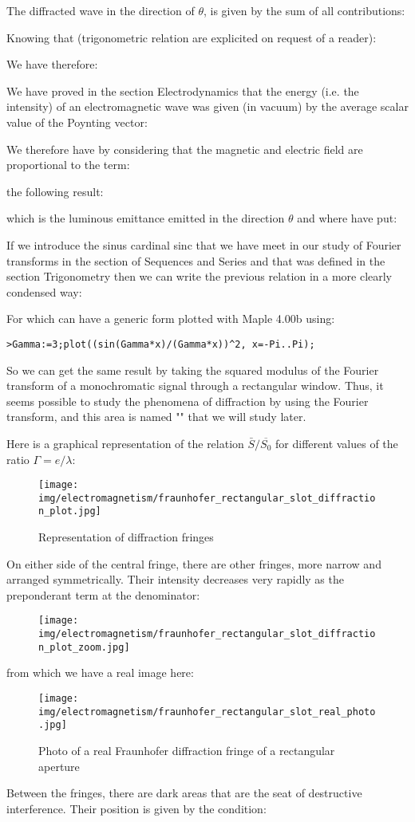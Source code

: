 	The diffracted wave in the direction of $\theta$, is given by the sum of all contributions:
	
	Knowing that (trigonometric relation are explicited on request of a reader):
	
	We have therefore:
	
	We have proved in the section Electrodynamics that the energy (i.e. the intensity) of an electromagnetic wave was given (in vacuum) by the average scalar value of the Poynting vector:
	
	We therefore have by considering that the magnetic and electric field are proportional to the term:
	
	the following result:
	
	which is the luminous emittance emitted in the direction $\theta$ and where have put:
	
	If we introduce the sinus cardinal sinc that we have meet in our study of Fourier transforms in the section of Sequences and Series and that was defined in the section Trigonometry then we can write the previous relation in a more clearly condensed way:
	
	For which can have a generic form plotted with Maple 4.00b using:
	
	\texttt{>Gamma:=3;plot((sin(Gamma*x)/(Gamma*x))\string^2, x=-Pi..Pi);}
	
	So we can get the same result by taking the squared modulus of the Fourier transform of a monochromatic signal through a rectangular window. Thus, it seems possible to study the phenomena of diffraction by using the Fourier transform, and this area is named "" that we will study later.
	
	Here is a graphical representation of the relation $\bar{S}/\overline{S_0}$ for different values of the ratio $\Gamma=e/\lambda$:
	\begin{figure}[H]
		\centering
		\texttt{[image: img/electromagnetism/fraunhofer\_rectangular\_slot\_diffraction\_plot.jpg]}
		\caption{Representation of diffraction fringes}
	\end{figure}
	On either side of the central fringe, there are other fringes, more narrow and arranged symmetrically. Their intensity decreases very rapidly as the preponderant  term at the denominator:
	
	\begin{figure}[H]
		\centering
		\texttt{[image: img/electromagnetism/fraunhofer\_rectangular\_slot\_diffraction\_plot\_zoom.jpg]}
	\end{figure}
	from which we have a real image here:
	\begin{figure}[H]
		\centering
		\texttt{[image: img/electromagnetism/fraunhofer\_rectangular\_slot\_real\_photo.jpg]}
		\caption{Photo of a real Fraunhofer diffraction fringe of a rectangular aperture}
	\end{figure}
	Between the fringes, there are dark areas that are the seat of destructive interference. Their position is given by the condition\label{destructive interference pattern}:
	
